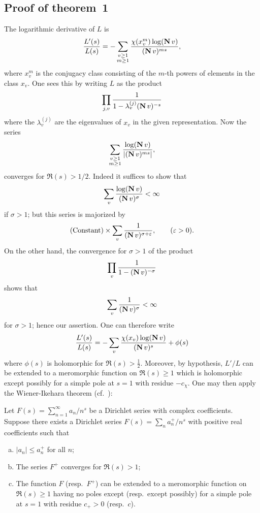 \begin{subappendices}
\subsection{Proof of theorem~1}
The logarithmic derivative of $L$ is
\[
	\frac{L'(s)}{L(s)} = -\sum_{\substack{v\ge 1 \\ m\ge 1}}
	\frac{\chi(x_v^m) \log(\operatorname{\mathbf{N}} v)}{(\operatorname{\mathbf{N}} v)^{ms}},
\]
where $x_v^m$ is the conjugacy class consisting of the $m$-th powers of
elements in the class $x_v$. One sees this by writing $L$ as the product
\[
	\prod_{j, v} \frac{1}{1 - \lambda_v^{(j)}( \operatorname{\mathbf{N}} v )^{-s}}
\]
where
\dpage
the $\lambda_v^{(j)}$ are the eigenvalues of $x_v$ in the given representation.
Now the series
\[
	\sum_{\substack{v\ge 1 \\ m\ge 1}} \frac{\log(\operatorname{\mathbf{N}} v)}{ |(\operatorname{\mathbf{N}}
	v)^{ms}| },
\]
converges for $\Re(s) > 1/2$.  Indeed it suffices to show that
\[
	\sum_v \frac{\log(\operatorname{\mathbf{N}} v)}{ (\operatorname{\mathbf{N}} v)^\sigma } < \infty
\]
if $\sigma > 1$; but this series is majorized by
\[
	\text{(Constant)} \times \sum_{v} \frac{1}{(\operatorname{\mathbf{N}} v)^{\sigma +
	\varepsilon}}, \qquad (\varepsilon > 0).
\]
On the other hand, the convergence for $\sigma > 1$ of the product
\[
	\prod_{v} \frac{1}{1 - (\operatorname{\mathbf{N}} v)^{-\sigma}}
\]
shows that
\[
	\sum_{v} \frac{1}{(\operatorname{\mathbf{N}} v)^\sigma} < \infty
\]
for $\sigma > 1$; hence our assertion. One can therefore write
\[
	\frac{L'(s)}{L(s)} = -\sum_{v} \frac{\chi(x_v) \log(\operatorname{\mathbf{N}}
	v)}{(\operatorname{\mathbf{N}} v)^s} + \phi(s)
\] 
where $\phi(s)$ is holomorphic for $\Re(s) > \frac{1}{2}$. Moreover, by
hypothesis,
\dpage
$L'/L$ can be extended to a meromorphic function on $\Re(s) \ge 1$
which is holomorphic except possibly for a simple pole at $s = 1$ with residue
$-c_\chi$. One may then apply the Wiener-Ikehara theorem (cf.\ \cite[123]{13}):
\begin{thm}
	Let $F(s) = \sum_{n=1}^\infty a_n/n^s$ be a Dirichlet series with
	complex coefficients. Suppose there exists a Dirichlet series $F(s) =
	\sum_n a_n^+/n^s$ with positive real coefficients such that
\begin{enumerate}[(a)]
	\item $|a_n| \le a_n^+$ for all $n$;
	\item The series $F^+$ converges for $\Re(s) > 1$;
	\item The function $F$ (resp.\ $F^+$) can be extended to a meromorphic
		function on $\Re(s)\ge 1$ having no poles except (resp.\ except
		possibly) for a simple pole at $s=1$ with residue $c_+ > 0$
		(resp.\ $c$).
\end{enumerate}

\end{thm}
\end{subappendices}
